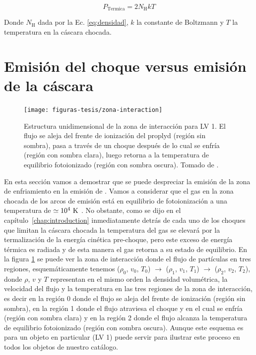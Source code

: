 \begin{equation}
  \label{eq:presion-cascara}
  P_{\text{Termica}} = 2 N_{\text{H}} k T 
\end{equation}
 
Donde \(N_{\text{H}}\) dada por la Ec. \ref{eq:densidad}, \(k\) la constante de Boltzmann y \(T\) la temperatura en la cáscara chocada.\\

\section{Emisión del choque versus emisión de la cáscara}
\label{sec:emis}

\begin{figure}
  \centering
  \texttt{[image: figuras-tesis/zona-interaction]}
  \caption{Estructura unidimensional de la zona de interacción para LV 1. El flujo se aleja del frente de ionización del proplyd (región sin sombra), pasa a través de un choque después de lo cual se enfría (región con sombra clara), luego  retorna a la temperatura de equilibrio fotoionizado (región con sombra oscura). Tomado de \citet{Henney:2002}.}
  \label{fig:cool}
\end{figure}

En esta sección vamos a demostrar que se puede despreciar la emisión de la zona de enfriamiento en la emisión de \ha{}. Vamos a considerar que el gas en la zona chocada de los arcos de emisión está en equilibrio de fotoionización a una temperatura de \(\simeq10^{4}~\mathrm{K}\) \citep{Henney:2002, Henney:2002a}. No obstante, como se dijo en el capítulo~\ref{chap:introduction} inmediatamente detrás de cada uno de los choques que limitan la cáscara chocada la temperatura del gas se elevará por la termalización de la energía cinética pre-choque, pero este exceso de energía térmica es radiada y de esta manera el gas retorna a su estado de equilibrio. En la figura \ref{fig:cool} se puede ver la zona de interacción donde el flujo de partículas en tres regiones, esquemáticamente tenemos (\(\rho_{0}\), \(v_{0}\), \(T_{0}\)) \(\rightarrow\) (\(\rho_{1}\), \(v_{1}\), \(T_{1}\)) \(\rightarrow\) (\(\rho_{2}\), \(v_{2}\), \(T_{2}\)), donde \(\rho\), \(v\) y \(T\) representan en el mismo orden la densidad volumétrica, la velocidad del flujo y la temperatura en las tres regiones de la zona de interacción, es decir en la región 0 donde el flujo se aleja del frente de ionización (región sin sombra), en la región 1 donde el flujo atraviesa el choque y en el cual se enfría (región con sombra clara) y en la región 2 donde el flujo alcanza la temperatura de equilibrio fotoionizado (región con sombra oscura). Aunque este esquema es para un objeto en particular (LV 1) puede servir para ilustrar este proceso en todos los objetos de nuestro catálogo.\\ 

